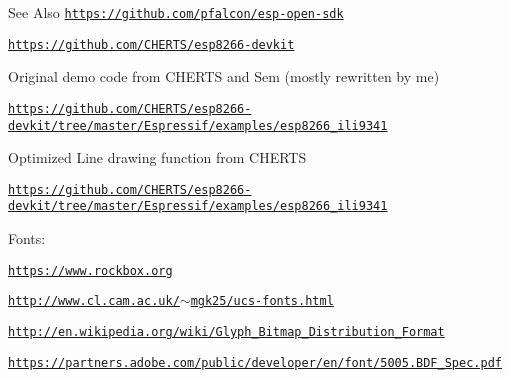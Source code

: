 \begin{DoxySeeAlso}{See Also}
\href{https://github.com/pfalcon/esp-open-sdk}{\tt https\-://github.\-com/pfalcon/esp-\/open-\/sdk} 

\href{https://github.com/CHERTS/esp8266-devkit}{\tt https\-://github.\-com/\-C\-H\-E\-R\-T\-S/esp8266-\/devkit}
\begin{DoxyItemize}
\item Original demo code from C\-H\-E\-R\-T\-S and Sem (mostly rewritten by me) 
\end{DoxyItemize}

\href{https://github.com/CHERTS/esp8266-devkit/tree/master/Espressif/examples/esp8266_ili9341}{\tt https\-://github.\-com/\-C\-H\-E\-R\-T\-S/esp8266-\/devkit/tree/master/\-Espressif/examples/esp8266\-\_\-ili9341}
\begin{DoxyItemize}
\item Optimized Line drawing function from C\-H\-E\-R\-T\-S 
\end{DoxyItemize}

\href{https://github.com/CHERTS/esp8266-devkit/tree/master/Espressif/examples/esp8266_ili9341}{\tt https\-://github.\-com/\-C\-H\-E\-R\-T\-S/esp8266-\/devkit/tree/master/\-Espressif/examples/esp8266\-\_\-ili9341}
\begin{DoxyItemize}
\item Fonts\-: 
\end{DoxyItemize}

\href{https://www.rockbox.org}{\tt https\-://www.\-rockbox.\-org} 

\href{http://www.cl.cam.ac.uk/~mgk25/ucs-fonts.html}{\tt http\-://www.\-cl.\-cam.\-ac.\-uk/$\sim$mgk25/ucs-\/fonts.\-html} 

\href{http://en.wikipedia.org/wiki/Glyph_Bitmap_Distribution_Format}{\tt http\-://en.\-wikipedia.\-org/wiki/\-Glyph\-\_\-\-Bitmap\-\_\-\-Distribution\-\_\-\-Format} 

\href{https://partners.adobe.com/public/developer/en/font/5005.BDF_Spec.pdf}{\tt https\-://partners.\-adobe.\-com/public/developer/en/font/5005.\-B\-D\-F\-\_\-\-Spec.\-pdf} 


\end{DoxySeeAlso}
